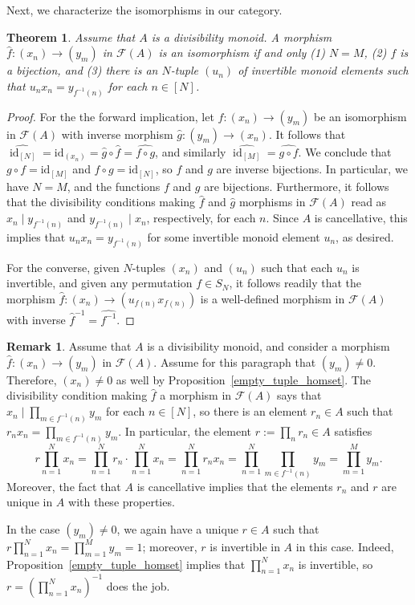 \documentclass[reqno]{amsart}
\theoremstyle{plain}
\newtheorem{thm}[lem]{Theorem}
\theoremstyle{definition}
\newtheorem{disc}[lem]{Remark}
\newcommand{\cat}[1]{\mathcal{#1}}
\newcommand{\catf}{\cat{F}}
\newcommand{\id}{\operatorname{id}}
\newcommand{\emptytuple}{\mathfrak{0}}
\numberwithin{equation}{lem}
\begin{document}
Next, we characterize the isomorphisms in our 
category.

\begin{thm}\label{iso-thm}
Assume that $A$ is a divisibility monoid.
A morphism $\hat{f}\colon(x_n) \to (y_m)$ in $\catf(A)$ is an isomorphism if and only (1) $N = M$, 
(2) $f$ is a bijection, and 
(3) there is an $N$-tuple 
$(u_n)$ of invertible monoid elements
such that   
$u_nx_n = y_{f^{-1}(n)}$
for each $n\in[N]$.
\end{thm}

\begin{proof}
For the 
the forward implication,
let $\hat{f}\colon(x_n) \to (y_m)$ be an isomorphism in $\catf(A)$ with inverse morphism $\hat{g}\colon(y_m) \to (x_n)$.
It follows that $\widehat{\id_{[N]}}=\text{id}_{(x_n)}=\hat{g} \circ \hat{f}=\widehat{f \circ g}$, and similarly
$\widehat{\id_{[M]}}=\widehat{g \circ f}$. We conclude that $g \circ f = \text{id}_{[M]}$ and 
$f \circ g = \text{id}_{[N]}$, so $f$ and $g$ are inverse bijections. In particular, we have $N=M$, and the functions $f$ and $g$ are bijections.
Furthermore, it follows that the divisibility conditions making $\hat f$ and $\hat g$ morphisms in $\catf(A)$
read as 
$x_n \mid y_{f^{-1}(n)}$  and $y_{f^{-1}(n)} \mid x_{n}$, respectively, for each $n$. 
Since $A$ is cancellative, this implies that $u_nx_n=y_{f^{-1}(n)}$ for some invertible monoid element $u_n$, as desired.

For  
the converse,
given  $N$-tuples $(x_n)$ and  $(u_n)$ such that each $u_n$ is invertible, and 
given any permutation $f \in S_N$, it follows readily that the morphism
$\hat f\colon(x_n) \to (u_{f(n)} x_{f(n)})$ is a well-defined morphism in $\catf(A)$ with inverse $\hat{f}^{-1}=\widehat{f^{-1}}$.
\end{proof}

\begin{disc}\label{disc171015b}
Assume that $A$ is a divisibility monoid, and
consider a morphism $\hat{f}\colon(x_n) \to (y_m)$ 
in $\catf(A)$. Assume for this paragraph that $(y_m)\neq\emptytuple$.
Therefore, $(x_n)\neq\emptytuple$ as well by Proposition~\ref{empty_tuple_homset}.
The divisibility condition making $\hat f$ a morphism in $\catf(A)$ says that
$x_n\mid\prod_{m\in f^{-1}(n)}y_m$ for each $n\in[N]$, so there is an element $r_n\in A$ such that
$r_nx_n=\prod_{m\in f^{-1}(n)}y_m$.
In particular, the element $r:=\prod_nr_n\in A$ satisfies
$$\textstyle
r\prod_{n=1}^Nx_n=\prod_{n=1}^Nr_n\cdot\prod_{n=1}^Nx_n=\prod_{n=1}^Nr_nx_n=\prod_{n=1}^N\prod_{m\in f^{-1}(n)}y_m=\prod_{m=1}^My_m.$$
Moreover, the fact that $A$ is cancellative implies that the elements $r_n$ and $r$ are unique in $A$ with these properties.

In the case $(y_m)\neq\emptytuple$, we again have a unique $r\in A$ such that 
$r\prod_{n=1}^Nx_n=\prod_{m=1}^My_m=1$; moreover, $r$ is invertible in $A$ in this case. Indeed, Proposition~\ref{empty_tuple_homset}
implies that $\prod_{n=1}^Nx_n$ is invertible, so $r=(\prod_{n=1}^Nx_n)^{-1}$ does the job.
\end{disc}
\end{document}

